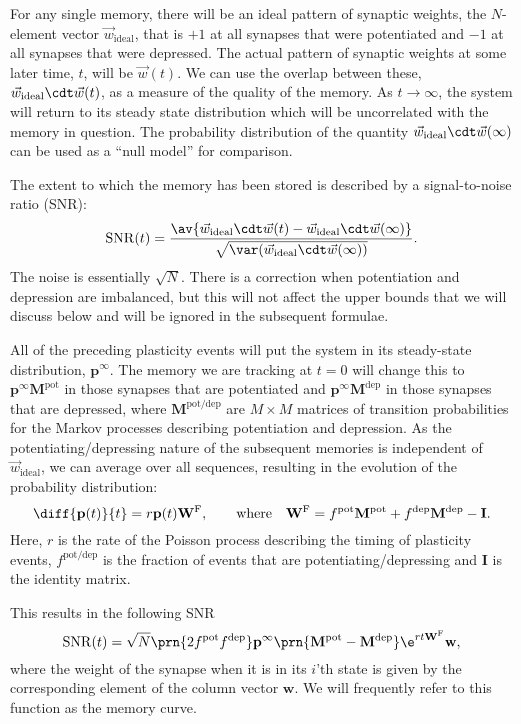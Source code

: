\documentclass{article} %
\DeclareMathOperator{\snr}{SNR}
\newcommand{\wv}{\vec{w}}
\newcommand{\wvi}{\vec{w}_\text{ideal}}
\newcommand{\I}{\mathbf{I}}
\newcommand{\pr}{\mathbf{p}}
\newcommand{\eq}{\pr^\infty}
\newcommand{\w}{\mathbf{w}}
\newcommand{\W}{\mathbf{W}}
\newcommand{\M}{\mathbf{M}}
\newcommand{\frg}{\W^{\mathrm{F}}}
\newcommand{\pot}{^{\text{pot}}}
\newcommand{\dep}{^{\text{dep}}}
\newcommand{\potdep}{^{\text{pot/dep}}}
\begin{document}
For any single memory, there will be an ideal pattern of synaptic weights, the $N$-element vector $\wvi$, that is $+1$ at all synapses that were potentiated and $-1$ at all synapses that were depressed.
The actual pattern of synaptic weights at some later time, $t$, will be $\wv(t)$.
We can use the overlap between these, $\wvi\cdt\wv(t)$, as a measure of the quality of the memory.
As $t\to\infty$, the system will return to its steady state distribution which will be uncorrelated with the memory in question.
The probability distribution of the quantity $\wvi\cdt\wv(\infty)$ can be used as a ``null model'' for comparison.

The extent to which the memory has been stored is described by a signal-to-noise ratio (SNR):
%
\begin{equation}\label{eq:SNRdef}
  \snr(t) = \frac{\av{\wv_\text{ideal}\cdt\wv(t) - \wv_\text{ideal}\cdt\wv(\infty)}}
     {\sqrt{\var(\wv_\text{ideal}\cdt\wv(\infty))}}.
\end{equation}
%
The noise is essentially $\sqrt{N}$.
There is a correction when potentiation and depression are imbalanced, but this will not affect the upper bounds that we will discuss below and will be ignored in the subsequent formulae.

All of the preceding plasticity events will put the system in its steady-state distribution, $\eq$.
The memory we are tracking at $t=0$ will change this to $\eq\M\pot$ in those synapses that are potentiated and $\eq\M\dep$ in those synapses that are depressed, where $\M\potdep$ are $M\times M$ matrices of transition probabilities for the Markov processes describing potentiation and depression.
As the potentiating/depressing nature of the subsequent memories is independent of $\wvi$, we can average over all sequences, resulting in the evolution of the probability distribution:
%
\begin{equation}\label{eq:evol}
  \diff{\pr(t)}{t} = r\pr(t)\frg,
  \qquad \text{where} \quad
  \frg = f\pot\M\pot + f\dep\M\dep - \I.
\end{equation}
%
Here, $r$ is the rate of the Poisson process describing the timing of plasticity events,
$f\potdep$ is the fraction of events that are potentiating/depressing and $\I$ is the identity matrix.

This results in the following SNR
%
\begin{equation}\label{eq:SNRcalc}
  \snr(t) = \sqrt{N}\prn{2 f\pot f\dep} \eq \prn{\M\pot-\M\dep} \e^{rt\frg} \w,
\end{equation}
%
where the weight of the synapse when it is in its $i$'th state is given by the corresponding element of the column vector $\w$.
We will frequently refer to this function as the memory curve.
\end{document}
